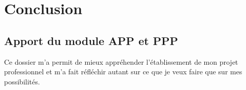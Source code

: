 \documentclass[a4paper,12pt, draft]{report}
\begin{document}
\part{Conclusion}
\chapter{Apport du module APP et PPP}
Ce dossier m'a permit de mieux appréhender l'établissement de mon projet professionnel et m'a fait réfléchir autant sur ce que je veux faire que sur mes possibilités.

\listoftables{}

\tableofcontents{}
\end{document}
